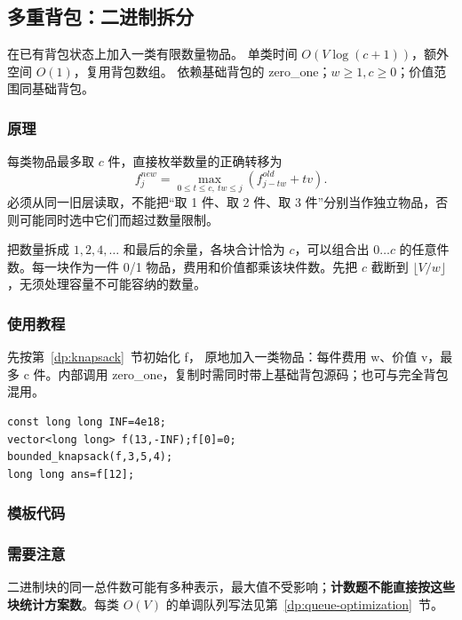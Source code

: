 \subsection{多重背包：二进制拆分}
\label{dp:bounded-knapsack}
\AlgorithmInfo
    {在已有背包状态上加入一类有限数量物品。}
    {单类时间 $O(V\log(c+1))$，额外空间 $O(1)$，复用背包数组。}
    {依赖基础背包的 zero\_one；$w\ge1,c\ge0$；价值范围同基础背包。}
\subsubsection*{原理}

每类物品最多取 $c$ 件，直接枚举数量的正确转移为
\[
 f^{new}_j=\max_{0\le t\le c,\ tw\le j}(f^{old}_{j-tw}+tv).
\]
必须从同一旧层读取，不能把“取 1 件、取 2 件、取 3 件”分别当作独立物品，否则可能同时选中它们而超过数量限制。

把数量拆成 $1,2,4,\ldots$ 和最后的余量，各块合计恰为 $c$，可以组合出 $0\ldots c$ 的任意件数。每一块作为一件 0/1 物品，费用和价值都乘该块件数。先把 $c$ 截断到 $\lfloor V/w\rfloor$，无须处理容量不可能容纳的数量。

\subsubsection*{使用教程}
先按第~\ref{dp:knapsack}~节初始化 f， 原地加入一类物品：每件费用 w、价值 v，最多 c 件。内部调用 zero\_one，复制时需同时带上基础背包源码；也可与完全背包混用。
\begin{lstlisting}[style=mtycpp,numbers=none]
const long long INF=4e18;
vector<long long> f(13,-INF);f[0]=0;
bounded_knapsack(f,3,5,4);
long long ans=f[12];
\end{lstlisting}
\subsubsection*{模板代码}
\subsubsection*{需要注意}
二进制块的同一总件数可能有多种表示，最大值不受影响；\textbf{计数题不能直接按这些块统计方案数}。每类 $O(V)$ 的单调队列写法见第~\ref{dp:queue-optimization}~节。
